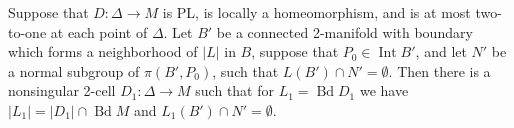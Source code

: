 Suppose that $D: \Delta \rightarrow M$ is PL, is locally a homeomorphism, and is at most two-to-one at each point of $\Delta$. Let $B'$ be a connected 2-manifold with boundary which forms a neighborhood of $|L|$ in $B$, suppose that $P_0 \in \operatorname{Int} B'$, and let $N'$ be a normal subgroup of $\pi(B', P_0)$, such that $L(B') \cap N' = \emptyset$. Then there is a nonsingular 2-cell $D_1: \Delta \rightarrow M$ such that for $L_1 = \operatorname{Bd} D_1$ we have $|L_1| = |D_1| \cap \operatorname{Bd} M$ and $L_1(B') \cap N' = \emptyset$.
